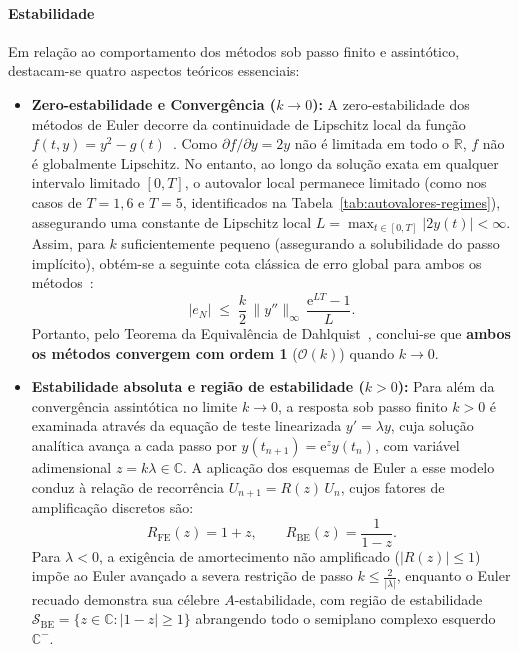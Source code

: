 \documentclass[12pt, a4paper]{article}
\begin{document}
\paragraph{Estabilidade} Em relação ao comportamento dos métodos sob passo finito e assintótico, destacam-se quatro aspectos teóricos essenciais:
\begin{itemize}
  \item \textbf{Zero-estabilidade e Convergência ($k \to 0$):} A zero-estabilidade dos métodos de Euler decorre da continuidade de Lipschitz local da função $f(t,y) = y^2 - g(t)$~\cite{leveque2007}. Como $\partial f/\partial y = 2y$ não é limitada em todo o $\mathbb{R}$, $f$ não é globalmente Lipschitz. No entanto, ao longo da solução exata em qualquer intervalo limitado $[0, T]$, o autovalor local permanece limitado (como nos casos de $T = 1{,}6$ e $T = 5$, identificados na Tabela~\ref{tab:autovalores-regimes}), assegurando uma constante de Lipschitz local $L = \max_{t \in [0,T]} |2y(t)| < \infty$. Assim, para $k$ suficientemente pequeno (assegurando a solubilidade do passo implícito), obtém-se a seguinte cota clássica de erro global para ambos os métodos~\cite{suli2003}: 
\begin{equation}\label{eq:cota_euler} 
|e_N| \;\le\; \frac{k}{2}\,\|y''\|_\infty\,\frac{\mathrm{e}^{LT} - 1}{L}. 
\end{equation} 
Portanto, pelo Teorema da Equivalência de Dahlquist~\cite{leveque2007}, conclui-se que \textbf{ambos os métodos convergem com ordem 1} ($\mathcal{O}(k)$) quando $k \to 0$.

  \item \textbf{Estabilidade absoluta e região de estabilidade ($k > 0$):} Para além da convergência assintótica no limite $k \to 0$, a resposta sob passo finito $k > 0$ é examinada através da equação de teste linearizada $y' = \lambda y$, cuja solução analítica avança a cada passo por $y(t_{n+1}) = \mathrm{e}^z y(t_n)$, com variável adimensional $z = k\lambda \in \mathbb{C}$. A aplicação dos esquemas de Euler a esse modelo conduz à relação de recorrência $U_{n+1} = R(z)\,U_n$, cujos fatores de amplificação discretos são:
\begin{equation}\label{eq:fatores-amplificacao}
  R_{\text{FE}}(z) = 1 + z, \qquad R_{\text{BE}}(z) = \frac{1}{1 - z}.
\end{equation}
Para $\lambda < 0$, a exigência de amortecimento não amplificado ($|R(z)| \le 1$) impõe ao Euler avançado a severa restrição de passo $k \le \frac{2}{|\lambda|}$, enquanto o Euler recuado demonstra sua célebre $A$-estabilidade, com região de estabilidade $\mathcal{S}_{\text{BE}} = \{z \in \mathbb{C} : |1 - z| \ge 1\}$ abrangendo todo o semiplano complexo esquerdo $\mathbb{C}^-$.
\end{itemize}
\end{document}
